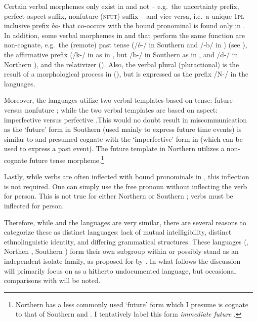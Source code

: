 \documentclass[output=paper]{langsci/langscibook}
\begin{document}
Certain  verbal morphemes only exist in  and not  – e.g.\ the uncertainty prefix, perfect aspect suffix, nonfuture (\textsc{nfut)} suffix  \citep{Ahland2012Gumuz} – and  vice versa, i.e.\ a unique 1\textsc{pl} inclusive prefix \textit{ba- }that co-occurs with the bound pronominal is found only in  . In addition, some verbal morphemes in  and  that perform the same function are non-cognate, e.g.\ the (remote) past tense (/é-/ in Southern  and /-b/ in ) (see ), the affirmative prefix (/k-/ in  as in , but /b-/ in Southern  as in , and /d-/ in Northern ), and the relativizer (). Also, the verbal plural (pluractional) is the result of a morphological process in  (), but is expressed as the prefix /N-/ in the  languages.

Moreover, the  languages utilize two verbal templates based on tense: future  versus nonfuture ; while the two  verbal templates are based on aspect: imperfective  versus perfective .This would no doubt result in miscommunication as the ‘future’ form in Southern  (used mainly to express future time events) is similar to and presumed cognate with the ‘imperfective’ form in  (which can be used to express a past event). The future template in Northern  utilizes a non-cognate future tense morpheme.\footnote{Northern  has a less commonly used ‘future’ form which I presume is cognate to that of Southern  and . I tentatively label this form \textit{immediate future} \citep[233]{Ahland2012Gumuz}.}


Lastly, while verbs are often inflected with bound pronominals in , this inflection is not required. One can simply use the free pronoun without inflecting the verb for person. This is not true for either Northern or Southern ; verbs must be inflected for person.

Therefore, while  and the  languages are very similar, there are several reasons to categorize these as distinct languages: lack of mutual intelligibility, distinct ethnolinguistic identity, and differing grammatical structures. These languages (, Northen , Southern ) form their own subgroup within  or possibly stand as an independent isolate family, as proposed for  by \citet{Dimmendaal2011}. In what follows the discussion will primarily focus on  as a hitherto undocumented language, but occasional comparisons with  will be noted.
\end{document}

